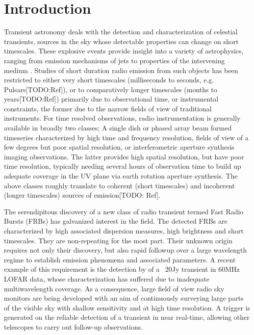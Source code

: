 \documentclass{ws-jai}
\begin{document}
\section{\label{sec:Introduction}Introduction}

\noindent Transient astronomy  deals with the detection  and characterization of
celestial transients, sources in the  sky whose detectable properties can change
on short timescales.   These explosive events provide insight into  a variety of
astrophysics,  ranging from  emission mechanisms  of jets  to properties  of the
intervening  medium \citep{fender2006lofar,lazio2009dynamic}.  Studies of  short
duration radio  emission from such  objects has  been restricted to  either very
short  timescales  (milliseconds to  seconds,  e.g.   Pulsars[TODO:Ref]), or  to
comparatively  longer timescales  (months to  years[TODO:Ref]) primarily  due to
observational time,  or instrumental constraints,  the former due to  the narrow
fields  of view  of traditional  instruments.  For  time resolved  observations,
radio instrumentation  is generally available  in broadly two classes;  A single
dish  or phased  array beam  formed timeseries  characterized by  high time  and
frequency  resolution,  fields  of  view  of a  few  degrees  but  poor  spatial
resolution,  or interferometric  aperture synthesis  imaging observations.   The
latter  provides  high  spatial  resolution,  but  have  poor  time  resolution,
typically  needing  several hours  of  observation  time  to build  up  adequate
coverage  in the  UV plane  via earth  rotation aperture  synthesis.  The  above
classes roughly translate to coherent  (short timescales) and incoherent (longer
timescales) sources of emission[TODO: Ref].

The serendipitous discovery of a new  class of radio transient termed Fast Radio
Bursts  (FRBs)\citep{spitler2015fast,   thornton2013population}  has  galvanized
interest in the  field.  The detected FRBs are characterized  by high associated
dispersion   measures,  high   brightness  and   short  timescales.    They  are
non-repeating for  the most part. Their  unknown origin requires not  only their
discovery, but also  rapid followup over a large wavelength  regime to establish
emission  phenomena  and  associated  parameters.   A  recent  example  of  this
requirement is the detection by \citet{stewart2016lofar} of a ~20Jy transient in
60MHz  LOFAR  data,  whose  characterization  has  suffered  due  to  inadequate
multiwavelength  coverage. As  a  consequence,  large field  of  view radio  sky
monitors are being  developed with an aim of continuously  surveying large parts
of  the visible  sky with  shallow sensitivity  and at  high time  resolution. A
trigger is generated on the reliable detection of a transient in near real-time,
allowing other telescopes to carry out follow-up observations.
\end{document}
